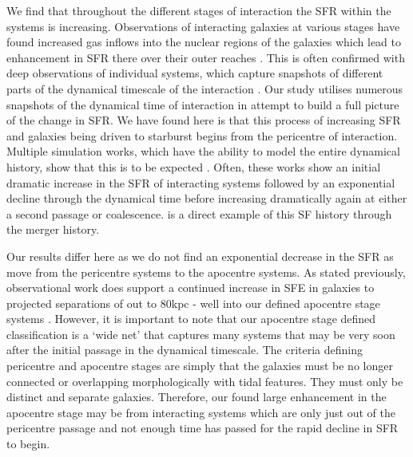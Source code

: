 We find that throughout the different stages of interaction the SFR within the systems is increasing. Observations of interacting galaxies at various stages have found increased gas inflows into the nuclear regions of the galaxies which lead to enhancement in SFR there over their outer reaches \citep{2015A&A...579A..45B}. This is often confirmed with deep observations of individual systems, which capture snapshots of different parts of the dynamical timescale of the interaction \citep{2022MNRAS.514.2769K}. Our study utilises numerous snapshots of the dynamical time of interaction in attempt to build a full picture of the change in SFR. We have found here is that this process of increasing SFR and galaxies being driven to starburst begins from the pericentre of interaction. Multiple simulation works, which have the ability to model the entire dynamical history, show that this is to be expected \citep{2007A&A...468...61D, 2013MNRAS.430.1901H, 2015MNRAS.452.2984K, 2021MNRAS.503.3113M}. Often, these works show an initial dramatic increase in the SFR of interacting systems followed by an exponential decline through the dynamical time before increasing dramatically again at either a second passage or coalescence. \citet{2015MNRAS.448.1107M} is a direct example of this SF history through the merger history.

Our results differ here as we do not find an exponential decrease in the SFR as move from the pericentre systems to the apocentre systems. As stated previously, observational work does support a continued increase in SFE in galaxies to projected separations of out to 80kpc - well into our defined apocentre stage systems \citep[for further examples, see][]{2008MNRAS.385.1903L, 2012MNRAS.426..549S}. However, it is important to note that our apocentre stage defined classification is a `wide net' that captures many systems that may be very soon after the initial passage in the dynamical timescale. The criteria defining pericentre and apocentre stages are simply that the galaxies must be no longer connected or overlapping morphologically with tidal features. They must only be distinct and separate galaxies. Therefore, our found large enhancement in the apocentre stage may be from interacting systems which are only just out of the pericentre passage and not enough time has passed for the rapid decline in SFR to begin. 

